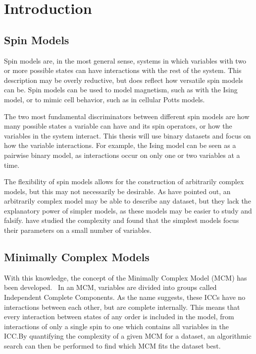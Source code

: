 \def\loge{Log(E)} 
\chapter{Introduction}\label{Introduction}
\section{Spin Models}
Spin models are, in the most general sense, systems in which variables with two or more possible states can have interactions with the rest of the system. This description may be overly reductive, but does reflect how versatile spin models can be. Spin models can be used to model magnetism, such as with the Ising model, or to mimic cell behavior, such as in cellular Potts models.

The two most fundamental discriminators between different spin models are how many possible states a variable can have and its spin operators, or how the variables in the system interact. This thesis will use binary datasets and focus on how the variable interactions. For example, the Ising model can be seen as a pairwise binary model, as interactions occur on only one or two variables at a time. 

The flexibility of spin models allows for the construction of arbitrarily complex models, but this may not necessarily be desirable. As \citet{bayesianinference} have pointed out, an arbitrarily complex model may be able to describe any dataset, but they lack the explanatory power of simpler models, as these models may be easier to study and falsify.\@ \citet{complexity} have studied the complexity and found that the simplest models focus their parameters on a small number of variables. 

\section{Minimally Complex Models}
With this knowledge, the concept of the Minimally Complex Model (MCM) has been developed.~\cite{bayesianinference} In an MCM, variables are divided into groups called Independent Complete Components. As the name suggests, these ICCs have no interactions between each other, but are complete internally. This means that every interaction between states of any order is included in the model, from interactions of only a single spin to one which contains all variables in the ICC.\@ By quantifying the complexity of a given MCM for a dataset, an algorithmic search can then be performed to find which MCM fits the dataset best. 

